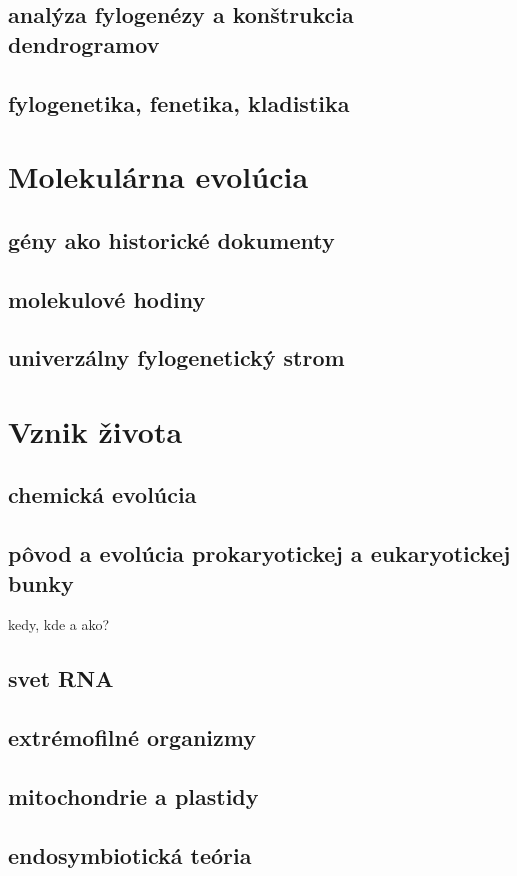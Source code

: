 \subsection{analýza fylogenézy a konštrukcia dendrogramov}
\subsection{fylogenetika, fenetika, kladistika}

\section{Molekulárna evolúcia}
\subsection{gény ako historické dokumenty}
\subsection{molekulové hodiny}
\subsection{univerzálny fylogenetický strom}

\section{Vznik života}
\subsection{chemická evolúcia}
\subsection{pôvod a evolúcia prokaryotickej a eukaryotickej bunky}
kedy, kde a ako?\\
\subsection{svet RNA}
\subsection{extrémofilné organizmy}
\subsection{mitochondrie a plastidy}
\subsection{endosymbiotická teória}

